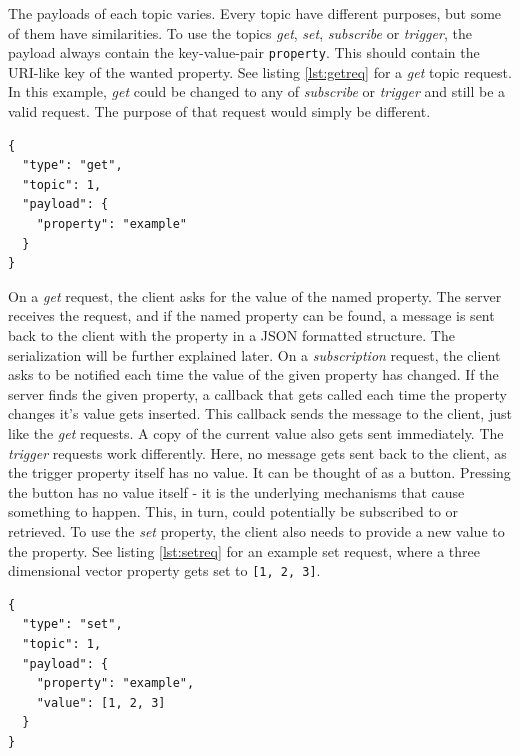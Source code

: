 The payloads of each topic varies. Every topic have different purposes, but some of them have similarities. To use the topics \emph{get}, \emph{set}, \emph{subscribe} or \emph{trigger}, the payload always contain the key-value-pair \texttt{property}. This should contain the URI-like key of the wanted property. See listing \ref{lst:getreq} for a \emph{get} topic request. In this example, \emph{get} could be changed to any of \emph{subscribe} or \emph{trigger} and still be a valid request. The purpose of that request would simply be different.

\begin{lstlisting}[caption={Example get request sent by the GUI},label=lst:getreq]
{
  "type": "get",
  "topic": 1,
  "payload": {
    "property": "example"
  }
}
\end{lstlisting}

On a \emph{get} request, the client asks for the value of the named property. The server receives the request, and if the named property can be found, a message is sent back to the client with the property in a JSON formatted structure. The serialization will be further explained later. On a \emph{subscription} request, the client asks to be notified each time the value of the given property has changed. If the server finds the given property, a callback that gets called each time the property changes it's value gets inserted. This callback sends the message to the client, just like the \emph{get} requests. A copy of the current value also gets sent immediately. The \emph{trigger} requests work differently. Here, no message gets sent back to the client, as the trigger property itself has no value. It can be thought of as a button. Pressing the button has no value itself - it is the underlying mechanisms that cause something to happen. This, in turn, could potentially be subscribed to or retrieved. To use the \emph{set} property, the client also needs to provide a new value to the property. See listing \ref{lst:setreq} for an example set request, where a three dimensional vector property gets set to \texttt{[1, 2, 3]}. 

\begin{lstlisting}[caption={Example get request sent by the GUI},label=lst:setreq]
{
  "type": "set",
  "topic": 1,
  "payload": {
    "property": "example",
    "value": [1, 2, 3]
  }
}
\end{lstlisting}

